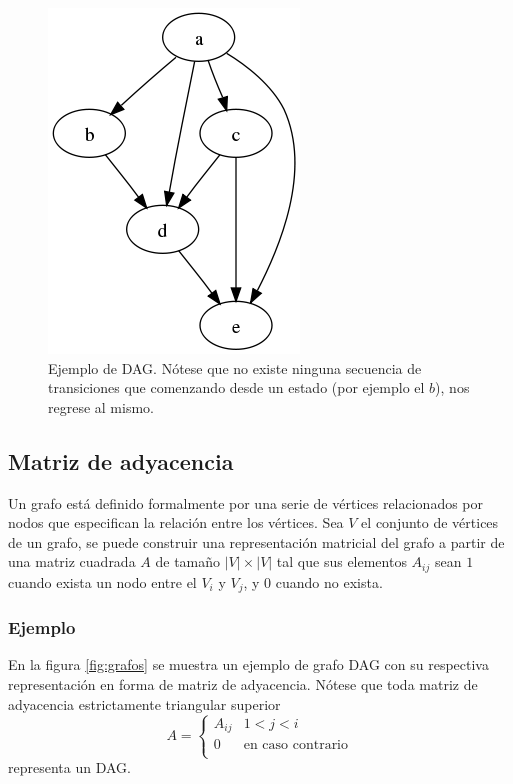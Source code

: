 \documentclass[10pt,a4paper]{article}
\begin{document}
\begin{figure}[h!]
\centering
\includegraphics[scale=0.4]{img/DAG}
\caption{Ejemplo de DAG. Nótese que no existe ninguna secuencia de transiciones que comenzando desde un estado (por ejemplo el $b$), nos regrese al mismo.}
\end{figure}


\subsection{Matriz de adyacencia}
Un grafo está definido formalmente por una serie de vértices relacionados por nodos que especifican la relación entre los vértices. Sea $V$ el conjunto de vértices de un grafo, se puede construir una representación matricial del grafo a partir de una matriz cuadrada $A$ de tamaño $|V| \times |V|$ tal que sus elementos $A_{ij}$ sean $1$ cuando exista un nodo entre el $V_i$ y $V_j$, y $0$ cuando no exista.

\subsubsection*{Ejemplo}
En la figura \ref{fig:grafos} se muestra un ejemplo de grafo DAG con su respectiva representación en forma de matriz de adyacencia. Nótese que toda matriz de adyacencia estrictamente triangular superior
\[
A = \begin{cases} 
      A_{ij} & 1 < j < i \\
     0 & \text{en caso contrario} \\
    \end{cases}
\]
representa un DAG.
\end{document}
